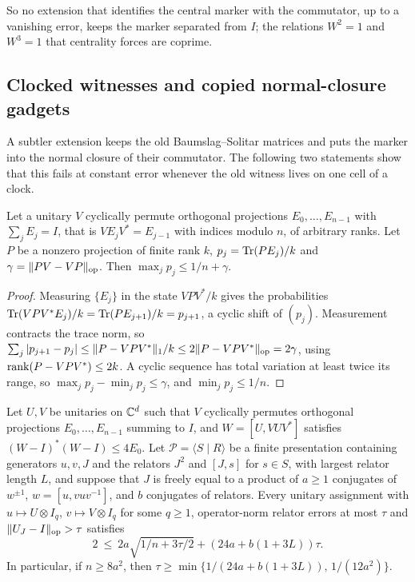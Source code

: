 So no extension that identifies the central marker with the commutator, up to a vanishing error, keeps the marker separated from
$I$; the relations $W^2=1$ and $W^3=1$ that centrality forces are coprime.

\subsection{Clocked witnesses and copied normal-closure gadgets}\label{app:floor-clock}

A subtler extension keeps the old Baumslag--Solitar matrices and puts the marker into the normal closure of their commutator. The
following two statements show that this fails at constant error whenever the old witness lives on one cell of a clock.

\begin{lemma}\label{lem:clock-proj}
Let a unitary $V$ cyclically permute orthogonal projections $E_0,\dots,E_{n-1}$ with $\sum_jE_j=I$, that is $VE_jV^*=E_{j-1}$ with
indices modulo $n$, of arbitrary ranks. Let $P$ be a nonzero projection of finite rank $k$, $p_j=\operatorname{Tr}(PE_j)/k$ and
$\gamma=\lVert PV-VP\rVert_{\mathrm{op}}$. Then $\max_jp_j\le1/n+\gamma$.
\end{lemma}

\begin{proof}
Measuring $\{E_j\}$ in the state $VPV^*/k$ gives the probabilities $\operatorname{Tr}(VPV^*E_j)/k=\operatorname{Tr}(PE_{j+1})/k=p_{j+1}$, a cyclic shift of $(p_j)$.
Measurement contracts the trace norm, so $\sum_j|p_{j+1}-p_j|\le\lVert P-VPV^*\rVert_1/k\le2\lVert P-VPV^*\rVert_{\mathrm{op}}=2\gamma$, using
$\operatorname{rank}(P-VPV^*)\le2k$. A cyclic sequence has total variation at least twice its range, so $\max_jp_j-\min_jp_j\le\gamma$, and
$\min_jp_j\le1/n$.
\end{proof}

\begin{proposition}\label{prop:copied-gadget}
Let $U,V$ be unitaries on $\mathbb C^d$ such that $V$ cyclically permutes orthogonal projections $E_0,\dots,E_{n-1}$ summing to $I$, and
$W=[U,VUV^*]$ satisfies $(W-I)^*(W-I)\le4E_0$. Let $\mathcal P=\langle S\mid R\rangle$ be a finite presentation containing generators
$u,v,J$ and the relators $J^2$ and $[J,s]$ for $s\in S$, with largest relator length $L$, and suppose that $J$ is freely equal to a
product of $a\ge1$ conjugates of $w^{\pm1}$, $w=[u,vuv^{-1}]$, and $b$ conjugates of relators. Every unitary assignment with
$u\mapsto U\otimes I_q$, $v\mapsto V\otimes I_q$ for some $q\ge1$, operator-norm relator errors at most $\tau$ and $\lVert U_J-I\rVert_{\mathrm{op}}>\tau$
satisfies
\[
2\ \le\ 2a\sqrt{1/n+3\tau/2}+(24a+b(1+3L))\tau .
\]
In particular, if $n\ge8a^2$, then $\tau\ge\min\{1/(24a+b(1+3L)),\,1/(12a^2)\}$.
\end{proposition}

